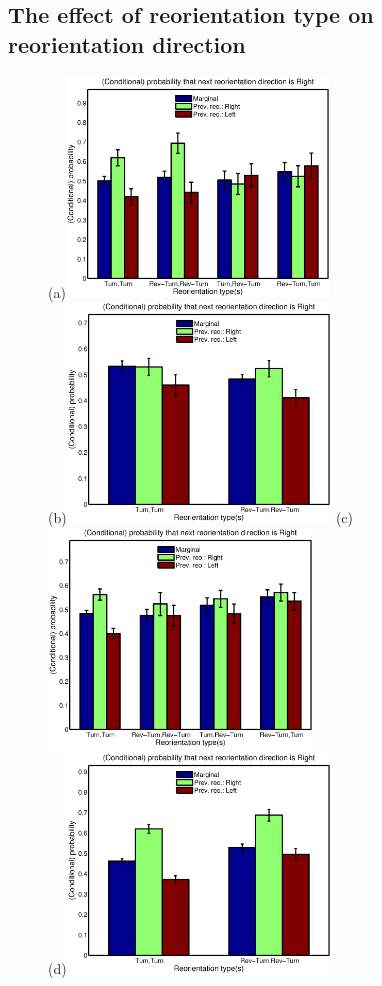 \documentclass[12pt]{article}
\begin{document}
\subsection{The effect of reorientation type on reorientation direction}\label{sec:dirvstype}

\begin{figure}
\begin{center}
  (a)\includegraphics[width=7cm]{cond_dir_vs_type_(neutral).eps}\\
  (b)\includegraphics[width=7cm]{cond_dir_vs_type_(cryophilic).eps}
  (c)\includegraphics[width=7cm]{cond_dir_vs_type_(thermophilic).eps}\\
  (d)\includegraphics[width=7cm]{cond_dir_vs_type_(saltphilic).eps}

\end{center}
\end{figure}
\end{document}
